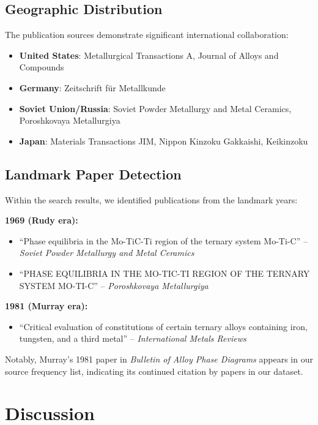 \documentclass[11pt,a4paper]{article}
\begin{document}
\subsection{Geographic Distribution}

The publication sources demonstrate significant international collaboration:
\begin{itemize}
    \item \textbf{United States}: Metallurgical Transactions A, Journal of Alloys and Compounds
    \item \textbf{Germany}: Zeitschrift f{\"u}r Metallkunde
    \item \textbf{Soviet Union/Russia}: Soviet Powder Metallurgy and Metal Ceramics, Poroshkovaya Metallurgiya
    \item \textbf{Japan}: Materials Transactions JIM, Nippon Kinzoku Gakkaishi, Keikinzoku
\end{itemize}

\subsection{Landmark Paper Detection}

Within the search results, we identified publications from the landmark years:

\textbf{1969 (Rudy era):}
\begin{itemize}
    \item ``Phase equilibria in the Mo-TiC-Ti region of the ternary system Mo-Ti-C'' -- \textit{Soviet Powder Metallurgy and Metal Ceramics}
    \item ``PHASE EQUILIBRIA IN THE MO-TIC-TI REGION OF THE TERNARY SYSTEM MO-TI-C'' -- \textit{Poroshkovaya Metallurgiya}
\end{itemize}

\textbf{1981 (Murray era):}
\begin{itemize}
    \item ``Critical evaluation of constitutions of certain ternary alloys containing iron, tungsten, and a third metal'' -- \textit{International Metals Reviews}
\end{itemize}

Notably, Murray's 1981 paper in \textit{Bulletin of Alloy Phase Diagrams} appears in our source frequency list, indicating its continued citation by papers in our dataset.

\section{Discussion}
\end{document}
